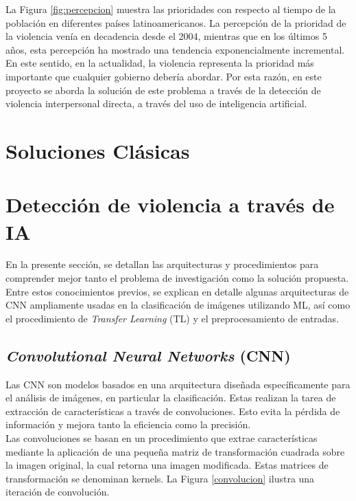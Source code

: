 La Figura \ref{fig:percepcion} muestra las prioridades con 
respecto al tiempo de la población en diferentes países 
latinoamericanos. La percepción de la prioridad de la violencia 
venía en decadencia desde el 2004, mientras que en los 
últimos 5 años, esta percepción ha mostrado una tendencia 
exponencialmente incremental. En este sentido, en la actualidad, 
la violencia representa la prioridad más importante que 
cualquier gobierno debería abordar. Por esta razón, en este 
proyecto se aborda la solución de este problema a través de la
detección de violencia interpersonal directa, a través del uso 
de inteligencia artificial. 

\section{Soluciones Clásicas}\label{solucionesClásicas}







\section{Detección de violencia a través de IA}\label{detecciónIA}
\thispagestyle{fancy}
En la presente sección, se detallan las arquitecturas y 
procedimientos para comprender mejor tanto el problema
de investigación como la solución propuesta. Entre estos
conocimientos previos, se explican en detalle algunas 
arquitecturas de CNN ampliamente usadas en la clasificación 
de imágenes utilizando ML, así como el procedimiento de 
\textit{Transfer Learning} (TL) y el preprocesamiento de 
entradas. \\

\subsection{\textit{Convolutional Neural Networks} (CNN)}

Las CNN son modelos basados en una arquitectura diseñada
específicamente para el análisis de imágenes, en particular
la clasificación. Estas realizan la tarea de extracción de
características a través de convoluciones. Esto evita la 
pérdida de información y mejora tanto la eficiencia como 
la precisión.\\

Las convoluciones se basan en un procedimiento que extrae
características mediante la aplicación de una pequeña matriz
de transformación cuadrada sobre la imagen original, la cual
retorna una imagen modificada. Estas matrices de transformación
se denominan kernels. La Figura \ref{convolucion} ilustra una
iteración de convolución.\\

